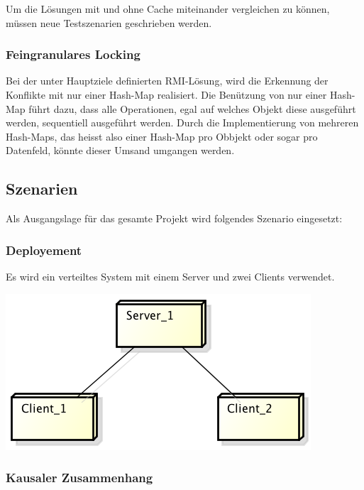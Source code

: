 \documentclass{article}
\begin{document}
Um die Lösungen mit und ohne Cache miteinander vergleichen zu können, müssen neue Testszenarien geschrieben werden.

\subsubsection{Feingranulares Locking}
\label{sec:feingr-lock}

Bei der unter Hauptziele definierten RMI-Lösung, wird die Erkennung der Konflikte mit nur einer Hash-Map realisiert. Die Benützung von nur einer Hash-Map führt dazu, dass alle Operationen, egal auf welches Objekt diese ausgeführt werden, sequentiell ausgeführt werden. Durch die Implementierung von mehreren Hash-Maps, das heisst also einer Hash-Map pro Obbjekt oder sogar pro Datenfeld, könnte dieser Umsand umgangen werden.

\subsection{Szenarien}
\label{sec:szenario}

Als Ausgangslage für das gesamte Projekt wird folgendes Szenario eingesetzt:

\subsubsection{Deployement}
\label{sec:deployement}

Es wird ein verteiltes System mit einem Server und zwei Clients verwendet.
\begin{center}
\includegraphics[scale=0.85]{Deployment.png}
\end{center}

\subsubsection{Kausaler Zusammenhang}
\label{sec:kaus-zusamm}
\end{document}
